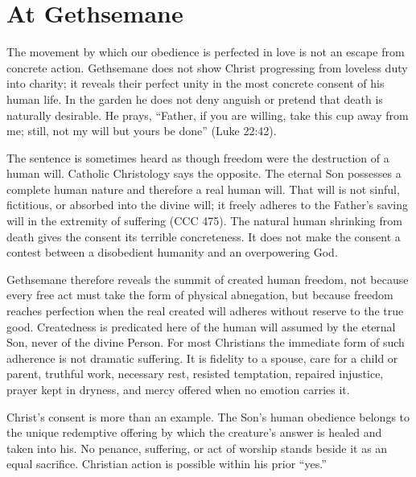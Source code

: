 \section{At Gethsemane}

The movement by which our obedience is perfected in love is not an escape from concrete action. Gethsemane does not show Christ progressing from loveless duty into charity; it reveals their perfect unity in the most concrete consent of his human life. In the garden he does not deny anguish or pretend that death is naturally desirable. He prays, ``Father, if you are willing, take this cup away from me; still, not my will but yours be done'' (Luke 22:42).

The sentence is sometimes heard as though freedom were the destruction of a human will. Catholic Christology says the opposite. The eternal Son possesses a complete human nature and therefore a real human will. That will is not sinful, fictitious, or absorbed into the divine will; it freely adheres to the Father's saving will in the extremity of suffering (CCC 475). The natural human shrinking from death gives the consent its terrible concreteness. It does not make the consent a contest between a disobedient humanity and an overpowering God.

Gethsemane therefore reveals the summit of created human freedom, not because every free act must take the form of physical abnegation, but because freedom reaches perfection when the real created will adheres without reserve to the true good. Createdness is predicated here of the human will assumed by the eternal Son, never of the divine Person. For most Christians the immediate form of such adherence is not dramatic suffering. It is fidelity to a spouse, care for a child or parent, truthful work, necessary rest, resisted temptation, repaired injustice, prayer kept in dryness, and mercy offered when no emotion carries it.

Christ's consent is more than an example. The Son's human obedience belongs to the unique redemptive offering by which the creature's answer is healed and taken into his. No penance, suffering, or act of worship stands beside it as an equal sacrifice. Christian action is possible within his prior ``yes.''

